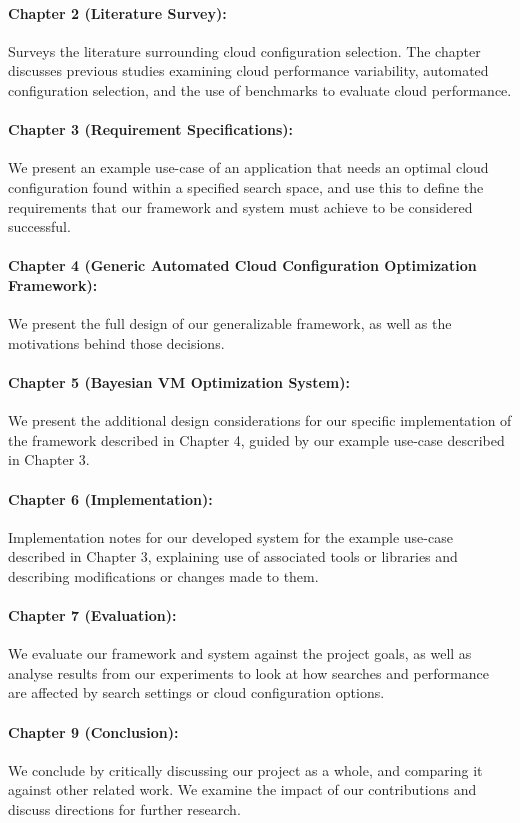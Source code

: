 \documentclass{report}
\begin{document}
\paragraph{Chapter 2 (Literature Survey):} Surveys the literature surrounding cloud configuration selection. The chapter discusses previous studies examining cloud performance variability, automated configuration selection, and the use of benchmarks to evaluate cloud performance.
\paragraph{Chapter 3 (Requirement Specifications):} We present an example use-case of an application that needs an optimal cloud configuration found within a specified search space, and use this to define the requirements that our framework and system must achieve to be considered successful.
\paragraph{Chapter 4 (Generic Automated Cloud Configuration Optimization Framework):} We present the full design of our generalizable framework, as well as the motivations behind those decisions.
\paragraph{Chapter 5 (Bayesian VM Optimization System):} We present the additional design considerations for our specific implementation of the framework described in Chapter 4, guided by our example use-case described in Chapter 3.
\paragraph{Chapter 6 (Implementation):} Implementation notes for our developed system for the example use-case described in Chapter 3, explaining use of associated tools or libraries and describing modifications or changes made to them.
\paragraph{Chapter 7 (Evaluation):} We evaluate our framework and system against the project goals, as well as analyse results from our experiments to look at how searches and performance are affected by search settings or cloud configuration options.
\paragraph{Chapter 9 (Conclusion):} We conclude by critically discussing our project as a whole, and comparing it against other related work. We examine the impact of our contributions and discuss directions for further research.
\end{document}
